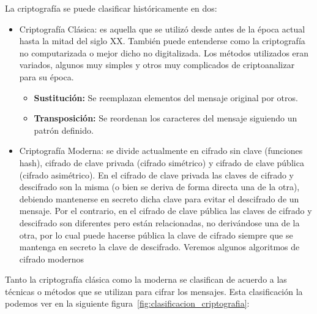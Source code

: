 La criptografía se puede clasificar históricamente en dos:
\begin{itemize}
    \item Criptografía Clásica: es aquella que se utilizó desde antes de la época actual hasta la mitad del siglo XX. También puede entenderse como la criptografía no computarizada o mejor dicho no digitalizada. Los métodos utilizados eran variados, algunos muy simples y otros muy complicados de criptoanalizar para su época. 
    \begin{itemize}
        \item \textbf{Sustitución:} Se reemplazan elementos del mensaje original por otros.
        \item \textbf{Transposición:} Se reordenan los caracteres del mensaje siguiendo un patrón definido.
    \end{itemize}
    
    \item Criptografía Moderna: se divide actualmente en cifrado sin clave (funciones hash), cifrado de clave privada (cifrado simétrico) y cifrado de clave pública (cifrado asimétrico). En el cifrado de clave privada las claves de cifrado y descifrado son la misma (o bien se deriva de forma directa una de la otra), debiendo mantenerse en secreto dicha clave para evitar el descifrado de un mensaje. Por el contrario, en el cifrado de clave pública las claves de cifrado y descifrado son diferentes pero están relacionadas, no derivándose una de la otra, por lo cual puede hacerse pública la clave de cifrado siempre que se mantenga en secreto la clave de descifrado. Veremos algunos algoritmos de cifrado modernos
\end{itemize}

Tanto la criptografía clásica como la moderna se clasifican de acuerdo a las técnicas o métodos que se utilizan para cifrar los mensajes. Esta clasificación la podemos ver en la siguiente figura~\ref{fig:clasificacion_criptografia}:

